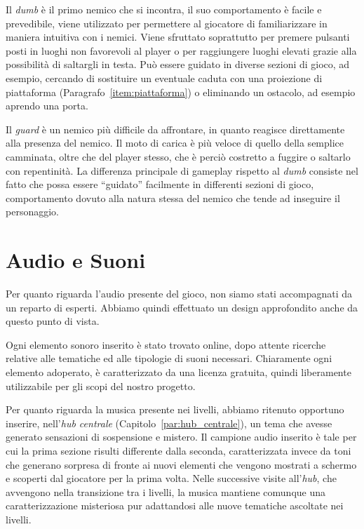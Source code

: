 Il \textit{dumb} è il primo nemico che si incontra, il suo comportamento è facile e prevedibile, viene utilizzato per permettere al giocatore di familiarizzare in maniera intuitiva con i nemici. Viene sfruttato soprattutto per premere pulsanti posti in luoghi non favorevoli al player o per raggiungere luoghi elevati grazie alla possibilità di saltargli in testa. Può essere guidato in diverse sezioni di gioco, ad esempio, cercando di sostituire un eventuale caduta con una proiezione di piattaforma (Paragrafo~\ref{item:piattaforma}) o eliminando un ostacolo, ad esempio aprendo una porta.

Il \textit{guard} è un nemico più difficile da affrontare, in quanto reagisce direttamente alla presenza del nemico. Il moto di carica è più veloce di quello della semplice camminata, oltre che del player stesso, che è perciò costretto a fuggire o saltarlo con repentinità. La differenza principale di gameplay rispetto al \textit{dumb} consiste nel fatto che possa essere “guidato” facilmente in differenti sezioni di gioco, comportamento dovuto alla natura stessa del nemico che tende ad inseguire il personaggio.

\section{Audio e Suoni}
\label{sec:audio}

Per quanto riguarda l’audio presente del gioco, non siamo stati accompagnati da un reparto di esperti. Abbiamo quindi effettuato un design approfondito anche da questo punto di vista. 

Ogni elemento sonoro inserito è stato trovato online, dopo attente ricerche relative alle tematiche ed alle tipologie di suoni necessari. Chiaramente ogni elemento adoperato, è caratterizzato da una licenza gratuita, quindi liberamente utilizzabile per gli scopi del nostro progetto.

Per quanto riguarda la musica presente nei livelli, abbiamo ritenuto opportuno inserire, nell’\textit{hub centrale} (Capitolo~\ref{par:hub_centrale}), un tema che avesse generato sensazioni di sospensione e mistero. Il campione audio inserito è tale per cui la prima sezione risulti differente dalla seconda, caratterizzata invece da toni che generano sorpresa di fronte ai nuovi elementi che vengono mostrati a schermo e scoperti dal giocatore per la prima volta.
Nelle successive visite all’\textit{hub}, che avvengono nella transizione tra i livelli, la musica mantiene comunque una caratterizzazione misteriosa pur adattandosi alle nuove tematiche ascoltate nei livelli.

